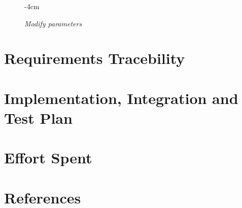 \documentclass{article}
\begin{document}
\begin{figure}[H]
\begin{adjustwidth} {-4cm}{}
			\end{adjustwidth}
			\caption{\emph{Modify parameters}}
		\end{figure}
		
		
	




\section{Requirements Tracebility}

\section{Implementation, Integration and Test Plan}

\section{Effort Spent}

\section{References}
\end{document}
